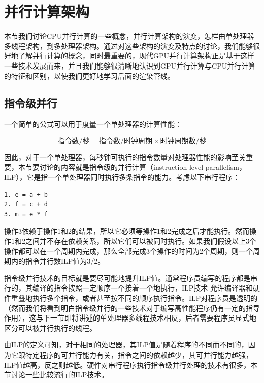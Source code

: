 \section{并行计算架构}
本节我们讨论CPU并行计算的一些概念，并行计算架构的演变，怎样由单处理器多线程架构，到多处理器架构。通过对这些架构的演变及特点的讨论，我们能够很好地了解并行计算的概念，同时最重要的，现代GPU并行计算架构正是基于这样一些技术发展而来，并且我们能够很清晰地认识到GPU并行计算与CPU并行计算的特征和区别，以使我们更好地学习后面的渲染管线。




\subsection{指令级并行}
一个简单的公式可以用于度量一个单处理器的计算性能：

\begin{equation}
	\text{指令数}/\text{秒}=\text{指令数}/\text{时钟周期}\times \text{时钟周期数}/\text{秒}
\end{equation}

\noindent 因此，对于一个单处理器，每秒钟可执行的指令数量对处理器性能的影响至关重要，本节要讨论的内容就是指令级的并行计算（instruction-level parallelism，ILP），它是指一个单处理器同时执行多条指令的能力。考虑以下串行程序：

\begin{lstlisting}
1. e = a + b
2. f = c + d
3. m = e * f
\end{lstlisting}

操作3依赖于操作1和2的结果，所以它必须等操作1和2完成之后才能执行。然而操作1和2之间并不存在依赖关系，所以它们可以被同时执行。如果我们假设以上3个操作都可以在一个周期内完成，那么全部完成3个操作的时间为2个周期，则一个周期内的指令并行数ILP值为3/2。

指令级并行技术的目标就是要尽可能地提升ILP值。通常程序员编写的程序都是串行的，其编译的指令按照一定顺序一个接着一个地执行，ILP技术 允许编译器和硬件重叠地执行多个指令，或者甚至按不同的顺序执行指令。ILP对程序员是透明的（然而我们将看到明白指令级并行的一些技术对于编写高性能程序仍有一定的指导作用），这与下一节即将讲述的单处理器多线程技术相反，后者需要程序员显式地区分可以被并行执行的线程。

由ILP的定义可知，对于相同的处理器，其ILP值是随着程序的不同而不同的，因为它跟特定程序的可并行能力有关，指令之间的依赖越少，其可并行能力越强，ILP值越高，反之则越低。硬件对串行程序执行指令级并行处理的技术有很多，本节讨论一些比较流行的ILP技术。





